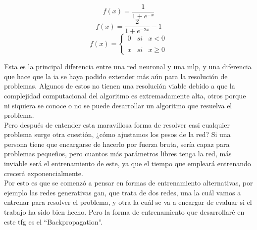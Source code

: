 \begin{equation}
	\label{Funcion sigmoide}
	f(x) =  \frac{\mathrm{1} }{\mathrm{1} + e^{-x} }
\end{equation}
\begin{equation}
	\label{Funcion tangente hiperbolica}
	f(x) =  \frac{\mathrm{2} }{\mathrm{1} + e^{-2x} }  - 1
\end{equation}
\begin{equation}
	\label{Funcion ReLU}
	f(x)= \left\{ \begin{array}{lcc}
		0 &   si  & x < 0 \\
		\\ x &  si  & x \geq 0
	\end{array}
	\right.
\end{equation}

Esta es la principal diferencia entre una red neuronal y una \gls{mlp}, y una diferencia que hace que la \gls{ia} se haya podido extender más aún para la resolución de problemas. Algunos de estos no tienen una resolución viable debido a que la complejidad computacional del algoritmo es extremadamente alta, otros porque ni siquiera se conoce o no se puede desarrollar un algoritmo que resuelva el problema. 
\\
Pero después de entender esta maravillosa forma de resolver casi cualquier problema surge otra cuestión, ¿cómo ajustamos los pesos de la red? Si una persona tiene que encargarse de hacerlo por fuerza bruta, sería capaz para problemas pequeños, pero cuantos más parámetros libres tenga la red, más inviable será el entrenamiento de este, ya que el tiempo que empleará entrenando crecerá exponencialmente.
\\
Por esto es que se comenzó a pensar en formas de entrenamiento alternativas, por ejemplo las redes generativas \gls{gan}, que trata de dos redes, una la cuál vamos a entrenar para resolver el problema, y otra la cuál se va a encargar de evaluar si el trabajo ha sido bien hecho. Pero la forma de entrenamiento que desarrollaré en este \gls{tfg} es el ``Backpropagation''.


